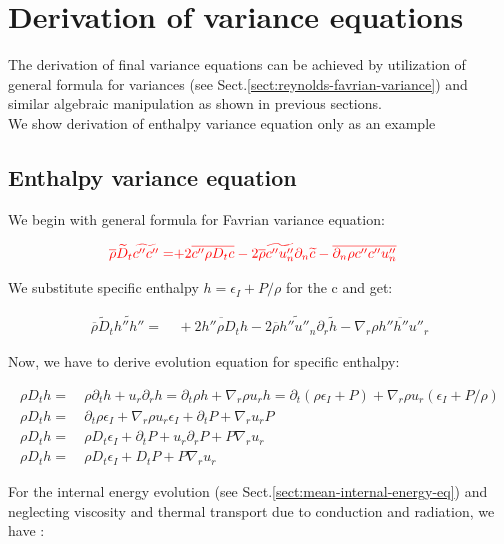 \documentclass[10pt,paper=a4]{report}
\newcommand{\eht}{\overline}
\newcommand{\fht}{\widetilde}
\begin{document}
\section{Derivation of variance equations}

The derivation of final variance equations can be achieved by utilization of general formula for variances (see Sect.\ref{sect:reynolds-favrian-variance}) and similar algebraic manipulation as shown in previous sections.\\

\noindent
We show derivation of enthalpy variance equation only as an example

\subsection{Enthalpy variance equation}

\noindent
We begin with general formula for Favrian variance equation:

\begin{align}
{\color{red}\eht{\rho}\fht{D}_t \fht{c''c''} =} & {\color{red}+2 \eht{c''\rho D_t c} - 2\eht{\rho}\fht{c''u''_n}\partial_n\fht{c} - \eht{\partial_n{\rho c''c'' u''_n}}} 
\end{align}

\noindent
We substitute specific enthalpy $h = \epsilon_I + P/ \rho$ for the c and get:

\begin{align}
\eht{\rho} \fht{D}_t \fht{h''h''} = & \ +\eht{2 h'' \rho D_t h} - 2 \eht{\rho} \fht{h''u''_n}\partial_r \fht{h} - \nabla_r \eht{\rho h''h''u''_r}
\end{align}  

\noindent
Now, we have to derive evolution equation for specific enthalpy:

\begin{align}
  \rho D_t h = & \ \rho \partial_t h + u_r \partial_r h = \partial_t \rho h + \nabla_r \rho u_r h = \partial_t (\rho \epsilon_I + P) + \nabla_r \rho u_r (\epsilon_I + P/ \rho) \\
  \rho D_t h = & \ \partial_t \rho \epsilon_I + \nabla_r \rho u_r \epsilon_I + \partial_t P + \nabla_r u_r P \\
  \rho D_t h = & \ \rho D_t \epsilon_I + \partial_t P + u_r \partial_r P + P\nabla_r u_r \\
  \rho D_t h = & \ \rho D_t \epsilon_I + D_t P + P\nabla_r u_r   
\end{align}  

\noindent
For the internal energy evolution (see Sect.\ref{sect:mean-internal-energy-eq}) and neglecting viscosity and thermal transport due to conduction and radiation, we have :
\end{document}
